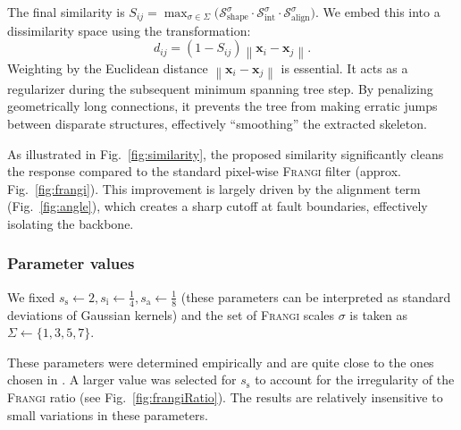 \documentclass[conference]{IEEEtran}
\newcommand{\norme}[1]{\left\lVert #1 \right\rVert}
\newcommand{\Frangi}[0]{\textsc{Frangi}}
\begin{document}
The final similarity is $S_{ij} = \max_{\sigma \in\Sigma} \bigl(\mathcal{S}_{\text{shape}}^\sigma \cdot \mathcal{S}_{\text{int}}^\sigma \cdot \mathcal{S}_{\text{align}}^\sigma\bigr)$. We embed this into a dissimilarity space using the transformation:
\begin{equation}
    d_{ij} =  \left( 1-S_{ij} \right) \norme{\mathbf{x}_i - \mathbf{x}_j}.
\end{equation}
Weighting by the Euclidean distance $\norme{\mathbf{x}_i - \mathbf{x}_j}$ is essential. It acts as a regularizer during the subsequent minimum spanning tree step. By penalizing geometrically long connections, it prevents the tree from making erratic jumps between disparate structures, effectively ``smoothing'' the extracted skeleton.



As illustrated in Fig.~\ref{fig:similarity}, the proposed %
similarity significantly cleans the response compared to the standard pixel-wise \Frangi{} filter (approx. Fig.~\ref{fig:frangi}). This improvement is largely driven by the alignment term (Fig.~\ref{fig:angle}), which creates a sharp cutoff at fault boundaries, effectively isolating the backbone.

\subsubsection{Parameter values}

We fixed 
$ s_{\mathrm{s}} \gets 2, s_{\mathrm{i}} \gets \tfrac14, s_{\mathrm{a}} \gets \tfrac18 $ (these parameters can be interpreted as standard deviations of Gaussian kernels) and the set of \Frangi{} scales $\sigma$ is taken as $ \Sigma \gets \{1,3,5,7 \}$.

These parameters were determined empirically and are quite close to the ones chosen in \cite{BibiStrasbourg}. A larger value was selected for $s_{\mathrm s}$ to account for the irregularity of the \Frangi{} ratio (see Fig.~\ref{fig:frangiRatio}). The results are relatively insensitive to small variations in these parameters.
\end{document}
